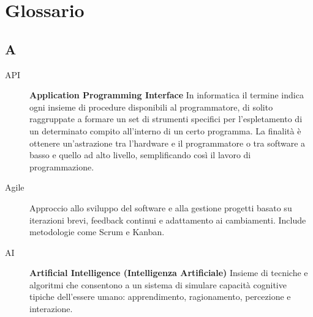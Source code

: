 \cleardoublepage
\chapter*{Glossario}


\section*{A}
\begin{description}
    \item[API] \textbf{Application Programming Interface} In informatica il termine indica ogni insieme di procedure disponibili al programmatore, di solito raggruppate a formare un set di strumenti specifici per l'espletamento di un determinato compito all'interno di un certo programma. La finalità è ottenere un'astrazione tra l'hardware e il programmatore o tra software a basso e quello ad alto livello, semplificando così il lavoro di programmazione.
    \item[Agile] Approccio allo sviluppo del software e alla gestione progetti basato su iterazioni brevi, feedback continui e adattamento ai cambiamenti. Include metodologie come Scrum e Kanban.
    \item[AI] \textbf{Artificial Intelligence (Intelligenza Artificiale)} Insieme di tecniche e algoritmi che consentono a un sistema di simulare capacità cognitive tipiche dell'essere umano: apprendimento, ragionamento, percezione e interazione.
\end{description}

